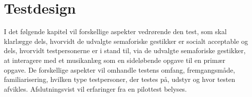 \chapter{Testdesign}
\label{TestdesignSocialAccept}
%
I det følgende kapitel vil forskellige aspekter vedrørende den test, som skal klarlægge dels, hvorvidt de udvalgte semaforiske gestikker er socialt acceptable og dels, hvorvidt testpersonerne er i stand til, via de udvalgte semaforiske gestikker, at interagere med et musikanlæg som en sideløbende opgave til en primær opgave. De forskellige aspekter vil omhandle testens omfang, fremgangsmåde, familiarisering, hvilken type testpersoner, der testes på, udstyr og hvor testen afvikles. Afslutningsvist vil erfaringer fra en pilottest belyses.